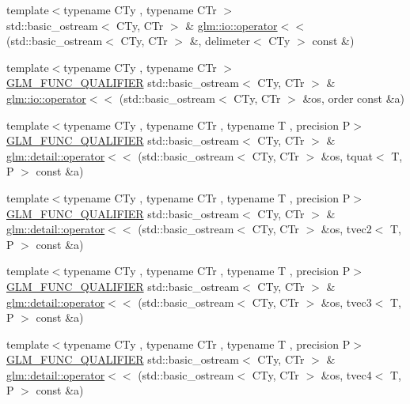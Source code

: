 \begin{DoxyCompactItemize}
{\footnotesize template$<$typename C\+Ty , typename C\+Tr $>$ }\\std\+::basic\+\_\+ostream$<$ C\+Ty, C\+Tr $>$ \& \hyperlink{namespaceglm_1_1io_a721b0bde3ed5f7d7b11a1d90d22a8ad3}{glm\+::io\+::operator$<$$<$} (std\+::basic\+\_\+ostream$<$ C\+Ty, C\+Tr $>$ \&, delimeter$<$ C\+Ty $>$ const \&)
\item 
{\footnotesize template$<$typename C\+Ty , typename C\+Tr $>$ }\\\hyperlink{setup_8hpp_a33fdea6f91c5f834105f7415e2a64407}{G\+L\+M\+\_\+\+F\+U\+N\+C\+\_\+\+Q\+U\+A\+L\+I\+F\+I\+ER} std\+::basic\+\_\+ostream$<$ C\+Ty, C\+Tr $>$ \& \hyperlink{namespaceglm_1_1io_a4dab7c825ecbd918643ed9fc9ef4ecb6}{glm\+::io\+::operator$<$$<$} (std\+::basic\+\_\+ostream$<$ C\+Ty, C\+Tr $>$ \&os, order const \&a)
\item 
{\footnotesize template$<$typename C\+Ty , typename C\+Tr , typename T , precision P$>$ }\\\hyperlink{setup_8hpp_a33fdea6f91c5f834105f7415e2a64407}{G\+L\+M\+\_\+\+F\+U\+N\+C\+\_\+\+Q\+U\+A\+L\+I\+F\+I\+ER} std\+::basic\+\_\+ostream$<$ C\+Ty, C\+Tr $>$ \& \hyperlink{namespaceglm_1_1detail_a1cfed6603f333415a9328c4c2ef528e2}{glm\+::detail\+::operator$<$$<$} (std\+::basic\+\_\+ostream$<$ C\+Ty, C\+Tr $>$ \&os, tquat$<$ T, P $>$ const \&a)
\item 
{\footnotesize template$<$typename C\+Ty , typename C\+Tr , typename T , precision P$>$ }\\\hyperlink{setup_8hpp_a33fdea6f91c5f834105f7415e2a64407}{G\+L\+M\+\_\+\+F\+U\+N\+C\+\_\+\+Q\+U\+A\+L\+I\+F\+I\+ER} std\+::basic\+\_\+ostream$<$ C\+Ty, C\+Tr $>$ \& \hyperlink{namespaceglm_1_1detail_a0162ef295b44cb504804e2264ca056af}{glm\+::detail\+::operator$<$$<$} (std\+::basic\+\_\+ostream$<$ C\+Ty, C\+Tr $>$ \&os, tvec2$<$ T, P $>$ const \&a)
\item 
{\footnotesize template$<$typename C\+Ty , typename C\+Tr , typename T , precision P$>$ }\\\hyperlink{setup_8hpp_a33fdea6f91c5f834105f7415e2a64407}{G\+L\+M\+\_\+\+F\+U\+N\+C\+\_\+\+Q\+U\+A\+L\+I\+F\+I\+ER} std\+::basic\+\_\+ostream$<$ C\+Ty, C\+Tr $>$ \& \hyperlink{namespaceglm_1_1detail_aa83d181a66296df066fe116683ebad73}{glm\+::detail\+::operator$<$$<$} (std\+::basic\+\_\+ostream$<$ C\+Ty, C\+Tr $>$ \&os, tvec3$<$ T, P $>$ const \&a)
\item 
{\footnotesize template$<$typename C\+Ty , typename C\+Tr , typename T , precision P$>$ }\\\hyperlink{setup_8hpp_a33fdea6f91c5f834105f7415e2a64407}{G\+L\+M\+\_\+\+F\+U\+N\+C\+\_\+\+Q\+U\+A\+L\+I\+F\+I\+ER} std\+::basic\+\_\+ostream$<$ C\+Ty, C\+Tr $>$ \& \hyperlink{namespaceglm_1_1detail_a22489a1ce723577c1b1ac3de1b89a4d6}{glm\+::detail\+::operator$<$$<$} (std\+::basic\+\_\+ostream$<$ C\+Ty, C\+Tr $>$ \&os, tvec4$<$ T, P $>$ const \&a)

\end{DoxyCompactItemize}
